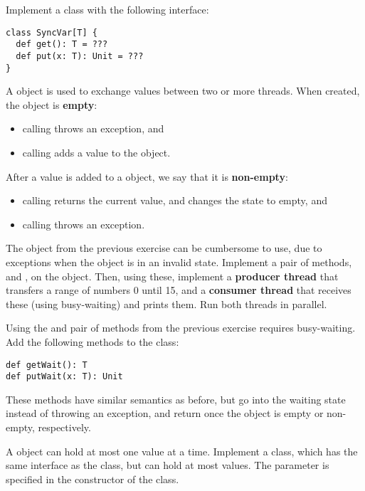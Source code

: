 \documentclass[11pt]{article}
\begin{document}
\begin{myExercise}Implement a  class with the following interface:
\begin{lstlisting}
class SyncVar[T] {
  def get(): T = ???
  def put(x: T): Unit = ???
}
\end{lstlisting}
A  object is used to exchange values between two or more threads.
When created, the  object is \textbf{empty}:
\begin{itemize}
  \item calling  throws an exception, and
  \item calling  adds a value to the  object.
\end{itemize}
After a value is added to a  object, we say that it is \textbf{non-empty}:
\begin{itemize}
  \item calling  returns the current value, and changes the state to empty, and
  \item calling  throws an exception.
\end{itemize}
\end{myExercise}

\begin{myExercise}The  object from the previous exercise can be cumbersome to use, due to exceptions when the  object is in an invalid state. Implement a pair of methods,  and , on the  object. Then, using these, implement a \textbf{producer thread} that transfers a range of numbers 0 until 15, and a \textbf{consumer thread} that receives these (using busy-waiting) and prints them. Run both threads in parallel.
\end{myExercise}

\begin{myExercise}Using the  and  pair of methods from the previous exercise requires busy-waiting. Add the following methods to the  class:
\begin{lstlisting}
def getWait(): T
def putWait(x: T): Unit
\end{lstlisting}
These methods have similar semantics as before, but go into the waiting state instead of throwing an exception, and return once the  object is empty or non-empty, respectively.
\end{myExercise}

\begin{myExercise}A  object can hold at most one value at a time. Implement a  class, which has the same interface as the  class, but can hold at most  values. The  parameter is specified in the constructor of the  class.
\end{myExercise}
\end{document}
